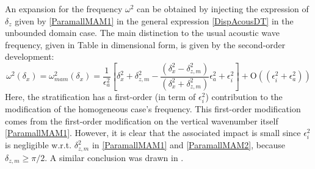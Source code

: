 An expansion  for the frequency $\omega^2$ can be obtained by injecting the expression of $\delta_z$ given by \ref{ParamallMAM1} in the general expression \ref{DispAcousDT} in the unbounded domain case.
The main distinction to the usual acoustic wave frequency, given in Table  in dimensional form, is given by the second-order development:
\begin{equation}
	\label{ParamallMAM2}
	\omega^2(\delta_x) =\omega_{mam}^2(\delta_x)=
	\frac{1}{\epsilon_a^2}
	\left[	\delta_x^2+\delta_{z,m}^2-\frac{(\delta_x^2-\delta_{z,m}^2)}{(\delta_x^2+\delta_{z,m}^2)}\epsilon_a^2+
	\epsilon_i^2
	\right]
		+\mathrm{O}	((\epsilon_i^2+\epsilon_a^2))
\end{equation}
Here, the stratification has a first-order (in term of $\epsilon_i^2$) contribution to the modification of the homogeneous case's frequency. This first-order modification comes from the first-order modification on the vertical wavenumber itself \ref{ParamallMAM1}. However, it is clear that the associated impact is small since $\epsilon_i^2$ is negligible w.r.t. $\delta_{z,m}^2$ in \ref{ParamallMAM1} and \ref{ParamallMAM2}, because $\delta_{z,m} \ge \pi/2$. A similar conclusion was drawn in \cite{smith_2015}.

